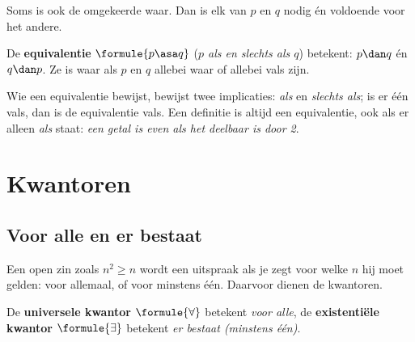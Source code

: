 Soms is ook de omgekeerde waar. Dan is elk van $p$ en $q$ nodig én voldoende voor het andere.

\begin{theorie}
De \textbf{\textcolor{accent}{equivalentie}} $\formule{p \asa q}$ (\textit{$p$ als en slechts als $q$}) betekent: $p \dan q$ én $q \dan p$. Ze is waar als $p$ en $q$ allebei waar of allebei vals zijn.
\end{theorie}

Wie een equivalentie bewijst, bewijst twee implicaties: \textit{als} en \textit{slechts als}; is er één vals, dan is de equivalentie vals. Een definitie is altijd een equivalentie, ook als er alleen \textit{als} staat: \textit{een getal is even als het deelbaar is door 2}.


\begin{oefeningen}
\end{oefeningen}

\section{Kwantoren}\label{sec:h1-kwantoren}

\subsection{Voor alle en er bestaat}

Een open zin zoals $n^2 \geqslant n$ wordt een uitspraak als je zegt voor welke $n$ hij moet gelden: voor allemaal, of voor minstens één. Daarvoor dienen de kwantoren.

\begin{theorie}
De \textbf{\textcolor{accent}{universele kwantor}} $\formule{\forall}$ betekent \textit{voor alle}, de \textbf{\textcolor{accent}{existentiële kwantor}} $\formule{\exists}$ betekent \textit{er bestaat (minstens één)}.
\end{theorie}

